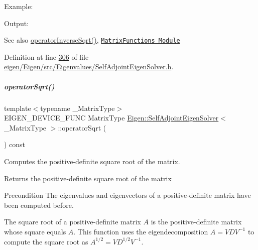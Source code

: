 Example\+: 
\begin{DoxyCodeInclude}
\end{DoxyCodeInclude}
 Output\+: 
\begin{DoxyVerbInclude}
\end{DoxyVerbInclude}


\begin{DoxySeeAlso}{See also}
\hyperlink{group___eigenvalues___module_a71fe0aea0b22d176efcea556c5c160f5}{operator\+Inverse\+Sqrt()}, \href{unsupported/group__MatrixFunctions__Module.html}{\tt Matrix\+Functions Module} 
\end{DoxySeeAlso}


Definition at line \hyperlink{eigen_2_eigen_2src_2_eigenvalues_2_self_adjoint_eigen_solver_8h_source_l00306}{306} of file \hyperlink{eigen_2_eigen_2src_2_eigenvalues_2_self_adjoint_eigen_solver_8h_source}{eigen/\+Eigen/src/\+Eigenvalues/\+Self\+Adjoint\+Eigen\+Solver.\+h}.

\mbox{\label{group___eigenvalues___module_a5c5158fd86366081bdabec38112c2c8a}} 
\subparagraph{\texorpdfstring{operator\+Sqrt()}{operatorSqrt()}\hspace{0.1cm}{\footnotesize\ttfamily [2/2]}}
{\footnotesize\ttfamily template$<$typename \+\_\+\+Matrix\+Type$>$ \\
E\+I\+G\+E\+N\+\_\+\+D\+E\+V\+I\+C\+E\+\_\+\+F\+U\+NC Matrix\+Type \hyperlink{group___eigenvalues___module_class_eigen_1_1_self_adjoint_eigen_solver}{Eigen\+::\+Self\+Adjoint\+Eigen\+Solver}$<$ \+\_\+\+Matrix\+Type $>$\+::operator\+Sqrt (\begin{DoxyParamCaption}{ }\end{DoxyParamCaption}) const\hspace{0.3cm}{\ttfamily [inline]}}



Computes the positive-\/definite square root of the matrix. 

\begin{DoxyReturn}{Returns}
the positive-\/definite square root of the matrix
\end{DoxyReturn}
\begin{DoxyPrecond}{Precondition}
The eigenvalues and eigenvectors of a positive-\/definite matrix have been computed before.
\end{DoxyPrecond}
The square root of a positive-\/definite matrix $ A $ is the positive-\/definite matrix whose square equals $ A $. This function uses the eigendecomposition $ A = V D V^{-1} $ to compute the square root as $ A^{1/2} = V D^{1/2} V^{-1} $.

